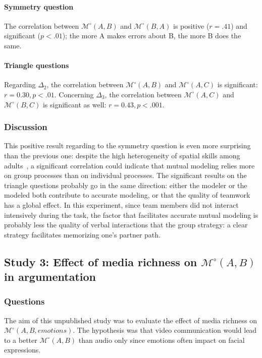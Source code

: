 \documentclass[twocolumn]{article}
\newcommand{\Model}[3]{{$\mathcal{M}^{\circ}(#1, #2, #3)$}}
\newcommand{\gModel}[2]{{$\mathcal{M}^{\circ}(#1, #2)$}}
\begin{document}
\paragraph{Symmetry question} The correlation between \gModel{A}{B}  and
\gModel{B}{A}  is positive ($r = .41$) and significant ($p < .01$);  the more A
makes errors about B, the more B does the same.

\paragraph{Triangle questions} Regarding $\Delta_2$, the correlation between
\gModel{A}{B} and \gModel{A}{C} is significant: $r=0.30, p <.01$. Concerning
$\Delta_3$, the correlation between \gModel{A}{C} and \gModel{B}{C} is
significant as well: $r=0.43, p <.001$.

\subsubsection*{Discussion}

This positive result regarding to the symmetry question is even more surprising
than the previous one: despite the high heterogeneity of spatial skills among
adults~\cite{liben1981spatial}, a significant correlation could indicate that
mutual modeling relies more on group processes than on individual processes. The
significant results on the triangle questions probably go in the same direction:
either the modeler or the modeled both contribute to accurate modeling, or that
the quality of teamwork has a global effect. In this experiment, since team
members did not interact intensively during the task, the factor that
facilitates accurate mutual modeling is probably less the quality of verbal
interactions that the group strategy: a clear strategy facilitates memorizing
one's partner path. 




\subsection{Study 3:  Effect of media richness on \gModel{A}{B} in argumentation}

\subsubsection*{Questions}

The aim of this unpublished study was to evaluate the effect of media richness
on \Model{A}{B}{emotions}. The hypothesis was that video communication would
lead to a better \gModel{A}{B} than audio only since emotions often impact on
facial expressions.
\end{document}
